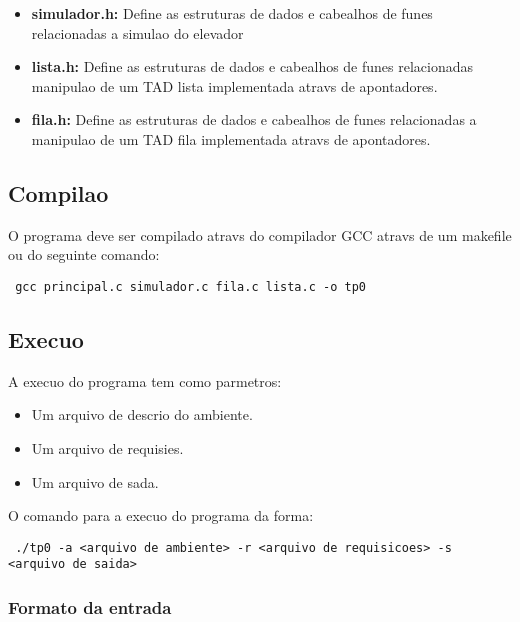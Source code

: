 \documentclass[12pt]{article}
\begin{document}
\begin{itemize}
\item \textbf{simulador.h:}  Define as estruturas de dados e cabealhos de funes relacionadas a simulao do elevador
\item \textbf{lista.h:} Define as estruturas de dados e cabealhos de funes relacionadas  manipulao de um TAD lista implementada atravs de apontadores.
\item \textbf{fila.h:} Define as estruturas de dados e cabealhos de funes relacionadas a manipulao de um TAD fila implementada atravs de apontadores.

\end{itemize}

\subsection{Compilao}

O programa deve ser compilado atravs do compilador GCC atravs de um makefile ou do seguinte comando:

\begin{footnotesize}
\begin{verbatim} gcc principal.c simulador.c fila.c lista.c -o tp0 \end{verbatim}
\end{footnotesize}

\subsection{Execuo}

A execuo do programa tem como parmetros:
\begin{itemize}
\item Um arquivo de descrio do ambiente.
\item Um arquivo de requisies.
\item Um arquivo de sada.
\end{itemize}

O comando para a execuo do programa  da forma:

\begin{footnotesize}
\begin{verbatim} ./tp0 -a <arquivo de ambiente> -r <arquivo de requisicoes> -s <arquivo de saida> \end{verbatim}
\end{footnotesize}

\subsubsection{Formato da entrada}
\end{document}
